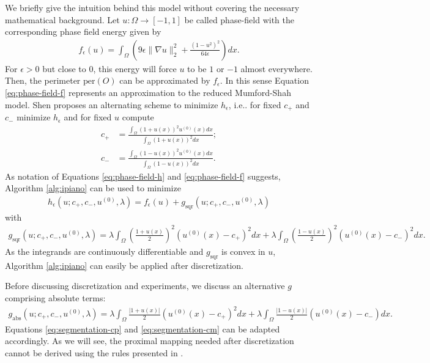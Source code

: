 \documentclass[onecolumn,final,a4paper,13pt,reqno]{siamart}
\makeatletter
\DeclareRobustCommand\onedot{\futurelet\@let@token\@onedot}
\def\@onedot{\ifx\@let@token.\else.\null\fi\xspace}
\def\ie{{i.e}\onedot} \def\Ie{{I.e}\onedot}
\def\per{\text{per}}
\makeatother
\begin{document}
We briefly give the intuition behind this model without covering the necessary mathematical background. Let $u : \Omega \rightarrow [-1, 1]$ be called phase-field with the corresponding phase field energy given by
\begin{align}
	f_\epsilon(u) = \int_\Omega \left(9\epsilon \|\nabla u\|_2^2 + \frac{(1 - u^2)^2}{64 \epsilon}\right) dx.\label{eq:phase-field-f}
\end{align}
For $\epsilon > 0$ but close to $0$, this energy will force $u$ to be $1$ or $-1$ almost everywhere. Then, the perimeter $\per(O)$ can be approximated by $f_\epsilon$. In this sense Equation \eqref{eq:phase-field-f} represents an approximation to the reduced Mumford-Shah model. Shen proposes an alternating scheme to minimize $h_\epsilon$, \ie for fixed $c_+$ and $c_-$ minimize $h_\epsilon$ and for fixed $u$ compute
\begin{align}
	c_+ &= \frac{\int_\Omega (1 + u(x))^2 u^{(0)}(x) dx}{\int_\Omega (1 + u(x))^2 dx};\label{eq:segmentation-cp}\\
	c_- &= \frac{\int_\Omega (1 - u(x))^2 u^{(0)}(x) dx}{\int_\Omega (1 - u(x))^2 dx}.\label{eq:segmentation-cm}
\end{align}
As notation of Equations \eqref{eq:phase-field-h} and \eqref{eq:phase-field-f} suggests, Algorithm \ref{alg:ipiano} can be used to minimize
\begin{align}
	h_\epsilon(u; c_+, c_-, u^{(0)}, \lambda) = f_\epsilon(u) + g_{\text{sqr}}(u; c_+, c_-, u^{(0)}, \lambda)
\end{align}
with
\begin{align}
	g_{\text{sqr}}(u; c_+, c_-, u^{(0)}, \lambda) = \lambda \int_{\Omega}\left(\frac{1 + u(x)}{2}\right)^2(u^{(0)}(x) - c_+)^2 dx + \lambda \int_{\Omega} \left(\frac{1 - u(x)}{2}\right)^2 (u^{(0)}(x) - c_-)^2 dx.
\end{align}
As the integrands are continuously differentiable and $g_{\text{sqr}}$ is convex in $u$, Algorithm \ref{alg:ipiano} can easily be applied after discretization. 

Before discussing discretization and experiments, we discuss an alternative $g$ comprising absolute terms:
\begin{align}
	g_{\text{abs}}(u; c_+, c_-, u^{(0)}, \lambda) = \lambda \int_{\Omega}\frac{|1 + u(x)|}{2}(u^{(0)}(x) - c_+)^2 dx + \lambda \int_{\Omega} \frac{|1 - u(x)|}{2} (u^{(0)}(x) - c_-)dx.
\end{align}
Equations \eqref{eq:segmentation-cp} and \eqref{eq:segmentation-cm} can be adapted accordingly. As we will see, the proximal mapping needed after discretization cannot be derived using the rules presented in \cite{CombettesPesquet:2011}.
\end{document}
